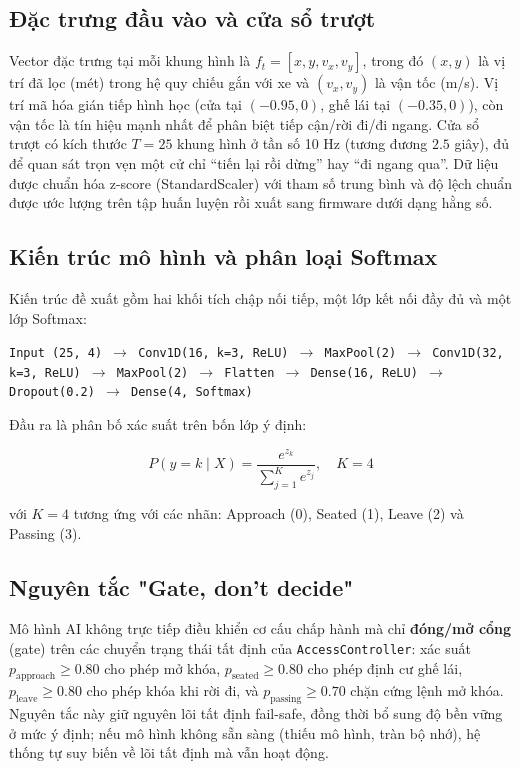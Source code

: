 \subsection{Đặc trưng đầu vào và cửa sổ trượt}

Vector đặc trưng tại mỗi khung hình là $f_t = [x, y, v_x, v_y]$, trong đó $(x, y)$ là vị trí đã lọc (mét) trong hệ quy chiếu gắn với xe và $(v_x, v_y)$ là vận tốc (m/s). Vị trí mã hóa gián tiếp hình học (cửa tại $(-0.95, 0)$, ghế lái tại $(-0.35, 0)$), còn vận tốc là tín hiệu mạnh nhất để phân biệt tiếp cận/rời đi/đi ngang. Cửa sổ trượt có kích thước $T = 25$ khung hình ở tần số 10 Hz (tương đương $2.5$ giây), đủ để quan sát trọn vẹn một cử chỉ ``tiến lại rồi dừng'' hay ``đi ngang qua''. Dữ liệu được chuẩn hóa z-score (StandardScaler) với tham số trung bình và độ lệch chuẩn được ước lượng trên tập huấn luyện rồi xuất sang firmware dưới dạng hằng số.

\subsection{Kiến trúc mô hình và phân loại Softmax}

Kiến trúc đề xuất gồm hai khối tích chập nối tiếp, một lớp kết nối đầy đủ và một lớp Softmax:

\begin{center}
\texttt{Input (25, 4) $\to$ Conv1D(16, k=3, ReLU) $\to$ MaxPool(2) $\to$ Conv1D(32, k=3, ReLU) $\to$ MaxPool(2) $\to$ Flatten $\to$ Dense(16, ReLU) $\to$ Dropout(0.2) $\to$ Dense(4, Softmax)}
\end{center}

Đầu ra là phân bố xác suất trên bốn lớp ý định:

\begin{equation}
    P(y=k \mid X) = \frac{e^{z_k}}{\sum_{j=1}^{K} e^{z_j}}, \quad K = 4
\end{equation}

với $K=4$ tương ứng với các nhãn: Approach (0), Seated (1), Leave (2) và Passing (3).

\subsection{Nguyên tắc "Gate, don't decide"}

Mô hình AI không trực tiếp điều khiển cơ cấu chấp hành mà chỉ \textbf{đóng/mở cổng} (gate) trên các chuyển trạng thái tất định của \texttt{AccessController}: xác suất $p_{\text{approach}} \ge 0.80$ cho phép mở khóa, $p_{\text{seated}} \ge 0.80$ cho phép định cư ghế lái, $p_{\text{leave}} \ge 0.80$ cho phép khóa khi rời đi, và $p_{\text{passing}} \ge 0.70$ chặn cứng lệnh mở khóa. Nguyên tắc này giữ nguyên lõi tất định fail-safe, đồng thời bổ sung độ bền vững ở mức ý định; nếu mô hình không sẵn sàng (thiếu mô hình, tràn bộ nhớ), hệ thống tự suy biến về lõi tất định mà vẫn hoạt động.